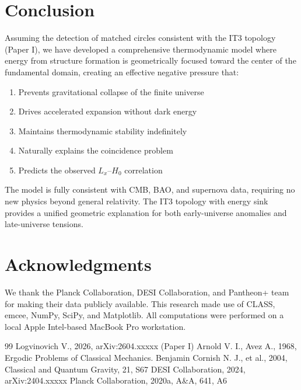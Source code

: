 \documentclass[12pt,a4paper]{article}
\begin{document}
\section{Conclusion}

Assuming the detection of matched circles consistent with the IT3 topology (Paper I), we have developed a comprehensive thermodynamic model where energy from structure formation is geometrically focused toward the center of the fundamental domain, creating an effective negative pressure that:
\begin{enumerate}
    \item Prevents gravitational collapse of the finite universe
    \item Drives accelerated expansion without dark energy
    \item Maintains thermodynamic stability indefinitely
    \item Naturally explains the coincidence problem
    \item Predicts the observed $L_x$--$H_0$ correlation
\end{enumerate}

The model is fully consistent with CMB, BAO, and supernova data, requiring no new physics beyond general relativity. The IT3 topology with energy sink provides a unified geometric explanation for both early-universe anomalies and late-universe tensions.

\section*{Acknowledgments}
We thank the Planck Collaboration, DESI Collaboration, and Pantheon+ team for making their data publicly available. This research made use of CLASS, emcee, NumPy, SciPy, and Matplotlib. All computations were performed on a local Apple Intel-based MacBook Pro workstation.

\begin{thebibliography}{99}
 Logvinovich V., 2026, arXiv:2604.xxxxx (Paper I)
 Arnold V. I., Avez A., 1968, Ergodic Problems of Classical Mechanics. Benjamin
 Cornish N. J., et al., 2004, Classical and Quantum Gravity, 21, S67
 DESI Collaboration, 2024, arXiv:2404.xxxxx
 Planck Collaboration, 2020a, A\&A, 641, A6
\end{thebibliography}
\end{document}
